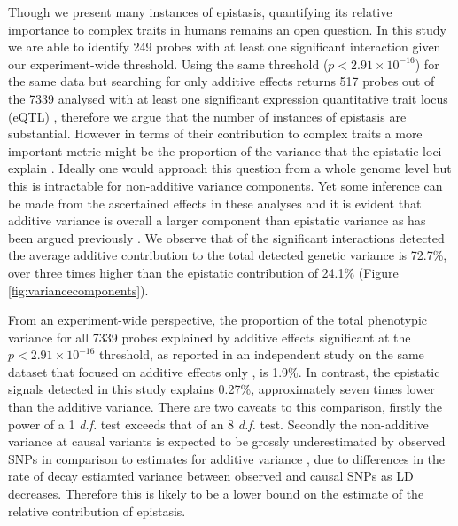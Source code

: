 \documentclass{article}
\begin{document}
Though we present many instances of epistasis, quantifying its relative importance to complex traits in humans remains an open question. In this study we are able to identify 249 probes with at least one significant interaction given our experiment-wide threshold. Using the same threshold ($p < 2.91 \times 10^{-16}$) for the same data but searching for only additive effects returns 517 probes out of the 7339 analysed with at least one significant expression quantitative trait locus (eQTL) \cite{Powell2012}, therefore we argue that the number of instances of epistasis are substantial. However in terms of their contribution to complex traits a more important metric might be the proportion of the variance that the epistatic loci explain \cite{Hill2008a}. Ideally one would approach this question from a whole genome level \cite{Visscher2008} but this is intractable for non-additive variance components. Yet some inference can be made from the ascertained effects in these analyses and it is evident that additive variance is overall a larger component than epistatic variance as has been argued previously \cite{Hill2008a, Crow2010}. We observe that of the significant interactions detected the average additive contribution to the total detected genetic variance is 72.7\%, over three times higher than the epistatic contribution of 24.1\% (Figure \ref{fig:variancecomponents}).

From an experiment-wide perspective, the proportion of the total phenotypic variance for all 7339 probes explained by additive effects significant at the $p < 2.91 \times 10^{-16}$ threshold, as reported in an independent study on the same dataset that focused on additive effects only \cite{Powell2012}, is 1.9\%. In contrast, the epistatic signals detected in this study explains 0.27\%, approximately seven times lower than the additive variance. There are two caveats to this comparison, firstly the power of a 1 \emph{d.f.} test exceeds that of an 8 \emph{d.f.} test. Secondly the non-additive variance at causal variants is expected to be grossly underestimated by observed SNPs in comparison to estimates for additive variance \cite{Weir2008, Hemani2013}, due to differences in the rate of decay estiamted variance between observed and causal SNPs as LD decreases. Therefore this is likely to be a lower bound on the estimate of the relative contribution of epistasis.
\end{document}
